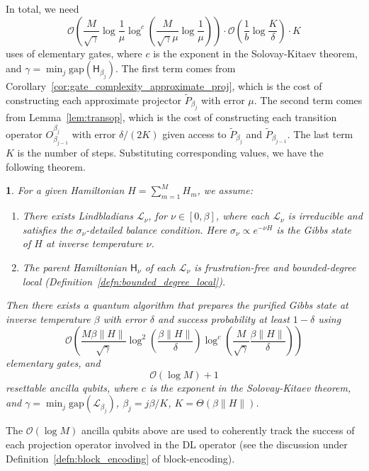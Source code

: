 \documentclass{article}
\newtheorem{thm}{\protect\theoremname}
\theoremstyle{plain}
\theoremstyle{plain}
\theoremstyle{plain}
\theoremstyle{plain}
\theoremstyle{plain}
\theoremstyle{plain}
\theoremstyle{plain}
\providecommand{\theoremname}{Theorem}
\newcommand{\norm}[1]{\lVert #1 \rVert}
\newcommand{\sfH}{\ensuremath{\mathsf{H}}}
\newcommand{\calO}{\ensuremath{\mathcal{O}}}
\begin{document}
In total, we need
\begin{equation}
    \calO \left(  \frac{M}{\sqrt{\gamma}} \log \frac{1}{\mu} \log^{c} \left(   \frac{M}{\sqrt{\gamma} \mu} \log \frac{1}{\mu}   \right)  \right) \cdot
    \calO \left( \frac{1}{b} \log \frac{K}{\delta} \right) \cdot K
\end{equation} uses of elementary gates, where $c$ is the exponent in the Solovay-Kitaev theorem, and $\gamma = \min_j \text{gap}(\sfH_{\beta_j})$. The first term comes from Corollary~\ref{cor:gate_complexity_approximate_proj}, which is the cost of constructing each approximate projector $\tilde{P}_{\beta_j}$ with error $\mu$. The second term comes from Lemma~\ref{lem:transop}, which is the cost of constructing each transition operator $O_{\beta_{j-1}}^{\beta_j}$ with error $\delta/(2K)$ given access to $\tilde{P}_{\beta_j}$ and $\tilde{P}_{\beta_{j-1}}$. The last term $K$ is the number of steps.
Substituting corresponding values, we have the following theorem.
\begin{thm}
    \label{thm:gibbsstateprepcomplex}
    For a given Hamiltonian $H = \sum_{m=1}^M H_m$, we assume: 
    \begin{enumerate}
        \item There exists Lindbladians $\mathcal{L}_\nu$, for $\nu\in[0,\beta]$, where each $\mathcal{L}_\nu$ is irreducible and satisfies the $\sigma_\nu$-detailed balance condition. Here $\sigma_\nu\propto e^{-\nu H}$ is the Gibbs state of $H$ at inverse temperature $\nu$.
        \item The parent Hamiltonian $\mathsf{H}_\nu$ of each $\mathcal{L}_\nu$ is frustration-free and bounded-degree local (Definition~\ref{defn:bounded_degree_local}).
    \end{enumerate}
    Then there exists a quantum algorithm that prepares the purified Gibbs state at inverse temperature $\beta$ with error $\delta$ and success probability at least $1-\delta$ using
    \begin{equation}
        \label{eq:gibbsstateprepruntime}
        \calO \left( \frac{M\beta \norm{H}}{\sqrt{\gamma}} \log^2 \left(\frac{\beta\norm{H}}{\delta}\right) \log^c \left( \frac{M}{\sqrt{\gamma}} \frac{\beta\norm{H}}{\delta} 
        \right) \right)
    \end{equation} elementary gates, and 
    \begin{equation}
        \label{eq:gibbsstateprepancillacnt}
        \calO (\log M) + 1
    \end{equation} resettable ancilla qubits,
    where $c$ is the exponent in the Solovay-Kitaev theorem, and $\gamma = \min_j \mathrm{gap}(\mathcal{L}_{\beta_j})$, $\beta_j = j\beta/K$, $K=\Theta(\beta\|H\|)$.
\end{thm}
The $\calO (\log M)$ ancilla qubits above are used to coherently track the success of each projection operator involved in the DL operator (see the discussion under Definition~\ref{defn:block_encoding} of block-encoding).
\end{document}
